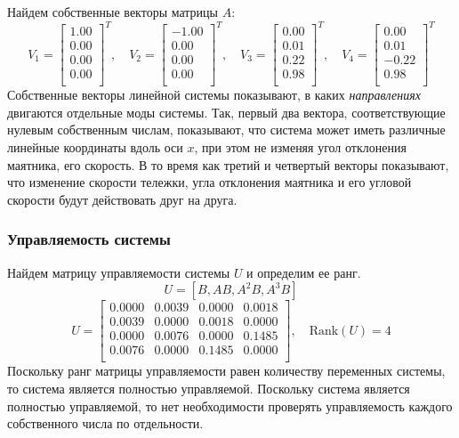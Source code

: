 Найдем собственные векторы матрицы $A$:
\begin{equation}
    V_1 = \begin{bmatrix}
    1.00  \\ 0.00  \\ 0.00 \\ 0.00 \\
    \end{bmatrix}^T,\quad
    V_2 = \begin{bmatrix}
    -1.00 \\ 0.00 \\ 0.00 \\ 0.00 \\
    \end{bmatrix}^T,\quad
    V_3 = \begin{bmatrix}
    0.00 \\ 0.01 \\ 0.22 \\ 0.98 \\
    \end{bmatrix}^T,\quad
    V_4 = \begin{bmatrix}
    0.00  \\ 0.01  \\ -0.22 \\ 0.98 \\
    \end{bmatrix}^T
    \label{eq:eigenvectors}
\end{equation}
Собственные векторы линейной системы показывают, в каких \textit{направлениях} двигаются отдельные моды системы. 
Так, первый два вектора, соответствующие нулевым собственным числам, показывают, что система может иметь различные
линейные координаты вдоль оси $x$, при этом не изменяя угол отклонения маятника, его скорость. В то время как третий и четвертый
векторы показывают, что изменение скорости тележки, угла отклонения маятника и его угловой скорости будут действовать 
друг на друга. 

\subsubsection{Управляемость системы}
Найдем матрицу управляемости системы $U$ и определим ее ранг. 
\begin{equation}
    U = [B, AB, A^2B, A^3B]
\end{equation}
\begin{equation}
    U = \begin{bmatrix}
    0.0000  & 0.0039  & 0.0000  & 0.0018 \\ 
    0.0039  & 0.0000  & 0.0018  & 0.0000 \\ 
    0.0000  & 0.0076  & 0.0000  & 0.1485 \\ 
    0.0076  & 0.0000  & 0.1485  & 0.0000 \\ 
    \end{bmatrix}, \quad \text{Rank}(U) = 4
    \label{eq:controlability_matrix}
\end{equation}
Поскольку ранг матрицы управляемости равен количеству переменных системы, то система является полностью управляемой. 
Поскольку система является полностью управляемой, то нет необходимости проверять управляемость каждого собственного 
числа по отдельности. 


